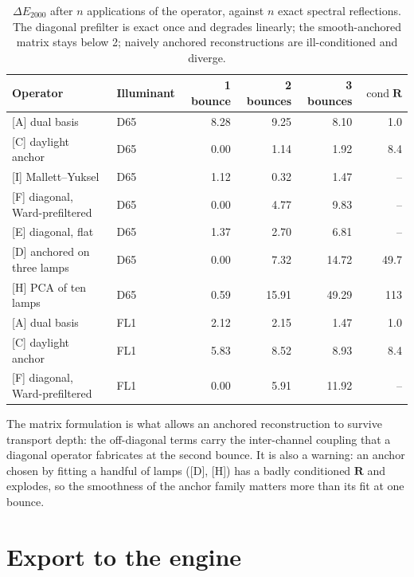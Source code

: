 \documentclass[11pt,a4paper]{article}
\newcommand{\mR}{\mathbf{R}}
\newcommand{\dE}{\Delta E_{2000}}
\begin{document}
\begin{table}[h]\centering\small
\begin{tabular}{@{}llrrrr@{}}
\toprule
Operator & Illuminant & 1 bounce & 2 bounces & 3 bounces & $\operatorname{cond}\mR$ \\
\midrule
{[A]} dual basis           & D65 & 8.28 & 9.25 & 8.10  & 1.0 \\
{[C]} daylight anchor      & D65 & 0.00 & 1.14 & 1.92  & 8.4 \\
{[I]} Mallett--Yuksel      & D65 & 1.12 & 0.32 & 1.47  & --  \\
{[F]} diagonal, Ward-prefiltered & D65 & 0.00 & 4.77 & 9.83 & -- \\
{[E]} diagonal, flat       & D65 & 1.37 & 2.70 & 6.81  & -- \\
{[D]} anchored on three lamps & D65 & 0.00 & 7.32 & 14.72 & 49.7 \\
{[H]} PCA of ten lamps     & D65 & 0.59 & 15.91 & 49.29 & 113 \\
\addlinespace
{[A]} dual basis           & FL1 & 2.12 & 2.15 & 1.47  & 1.0 \\
{[C]} daylight anchor      & FL1 & 5.83 & 8.52 & 8.93  & 8.4 \\
{[F]} diagonal, Ward-prefiltered & FL1 & 0.00 & 5.91 & 11.92 & -- \\
\bottomrule
\end{tabular}
\caption{$\dE$ after $n$ applications of the operator, against $n$ exact
spectral reflections.  The diagonal prefilter is exact once and degrades
linearly; the smooth-anchored matrix stays below 2; naively anchored
reconstructions are ill-conditioned and diverge.}
\label{tab:bounce}
\end{table}

The matrix formulation is what allows an anchored reconstruction to survive
transport depth: the off-diagonal terms carry the inter-channel coupling that a
diagonal operator fabricates at the second bounce.  It is also a warning: an
anchor chosen by fitting a handful of lamps ([D], [H]) has a badly conditioned
$\mR$ and explodes, so the smoothness of the anchor family matters more than
its fit at one bounce.

\section{Export to the engine}
\label{sec:godot}
\end{document}
